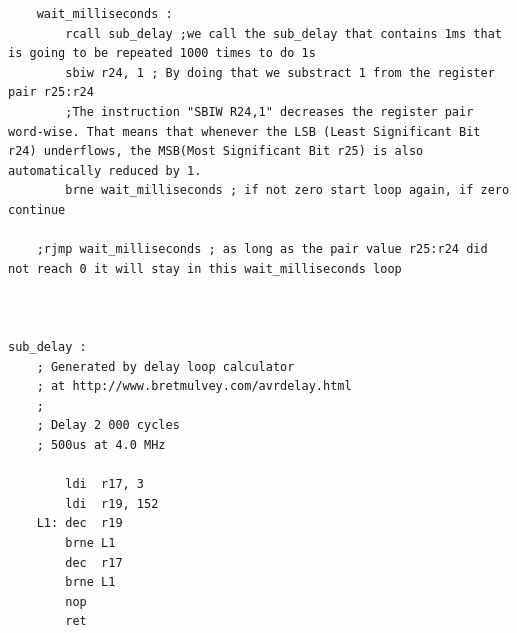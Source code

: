 \documentclass[a4paper,12pt]{article}
\begin{document}
\begin{lstlisting}
	wait_milliseconds :
		rcall sub_delay ;we call the sub_delay that contains 1ms that is going to be repeated 1000 times to do 1s
		sbiw r24, 1 ; By doing that we substract 1 from the register pair r25:r24
		;The instruction "SBIW R24,1" decreases the register pair word-wise. That means that whenever the LSB (Least Significant Bit r24) underflows, the MSB(Most Significant Bit r25) is also automatically reduced by 1.
		brne wait_milliseconds ; if not zero start loop again, if zero continue

	;rjmp wait_milliseconds ; as long as the pair value r25:r24 did not reach 0 it will stay in this wait_milliseconds loop
		


sub_delay : 
	; Generated by delay loop calculator
	; at http://www.bretmulvey.com/avrdelay.html
	;
	; Delay 2 000 cycles
	; 500us at 4.0 MHz

		ldi  r17, 3
		ldi  r19, 152
	L1: dec  r19
		brne L1
		dec  r17
		brne L1
		nop
		ret





\end{lstlisting}
\end{document}
